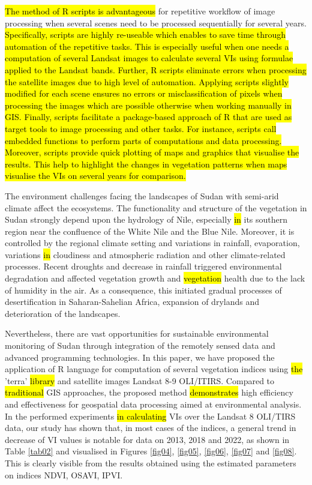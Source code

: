 \documentclass[jimaging,article,submit,pdftex,moreauthors]{Definitions/mdpi}
\begin{document}
\hl{The method of R scripts is advantageous} for repetitive workflow of image processing when several scenes need to be processed sequentially for several years. \hl{Specifically, scripts are highly re-useable which enables to save time through automation of the repetitive tasks. This is especially useful when one needs a computation of several Landsat images to calculate several VIs using formulae applied to the Landsat bands. Further, R scripts eliminate errors when processing the satellite images due to high level of automation. Applying scripts slightly modified for each scene ensures no errors or misclassification of pixels when processing the images which are possible otherwise when working manually in GIS. Finally, scripts facilitate a package-based approach of R that are used as target tools to image processing and other tasks. For instance, scripts call embedded functions to perform parts of computations and data processing. Moreover, scripts provide quick plotting of maps and graphics that visualise the results. This help to highlight the changes in vegetation patterns when maps visualise the VIs on several years for comparison. }

The environment challenges facing the landscapes of Sudan with  semi-arid climate affect the ecosystems. The functionality and structure of the vegetation in Sudan strongly depend upon the hydrology of Nile, especially \hl{in }its southern region near the confluence of the White Nile and the Blue Nile. Moreover, it is controlled by the regional climate setting and variations in rainfall, evaporation, variations \hl{in} cloudiness and atmospheric radiation and other climate-related processes. Recent droughts and decrease in rainfall triggered environmental degradation and affected vegetation growth and \hl{vegetation} health due to the lack of humidity in the air. As a consequence, this initiated gradual processes of desertification in Saharan-Sahelian Africa, expansion of drylands and deterioration of the landscapes. 

Nevertheless, there are vast opportunities for sustainable environmental monitoring of Sudan through integration of the remotely sensed data and advanced programming technologies. In this paper, we have proposed the application of R language for computation of several vegetation indices using \hl{the} 'terra' \hl{library }and satellite images Landsat 8-9 OLI/ITIRS. Compared to \hl{traditional} GIS approaches, the proposed method \hl{demonstrates} high efficiency and effectiveness for geospatial data processing aimed at environmental analysis. In the performed experiments \hl{in calculating} VIs over the Landsat 8 OLI/TIRS data, our study has shown that, in most cases of the indices, a general trend in decrease of VI values is notable for data on 2013, 2018 and 2022, as shown in Table \ref{tab02} and visualised in Figures \ref{fig04}, \ref{fig05}, \ref{fig06}, \ref{fig07} and \ref{fig08}. This is clearly visible from the results obtained using the estimated parameters on indices NDVI, OSAVI, IPVI. 
\end{document}

